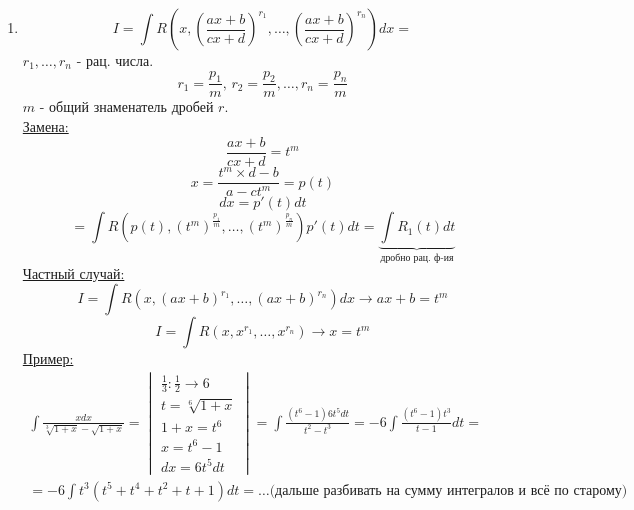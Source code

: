 \documentclass[12pt]{article}
\begin{document}
\begin{enumerate}
        \item \[ I = \int R\left( x, \left(\frac{ax+b}{cx+d}\right)^{r_1}, \dots, \left( \frac{ax+b}{cx+d} \right)^{r_n} \right)dx \boxed{=}\]
        $r_1, \dots, r_n$ - рац. числа.
        \[ r_1 = \frac{p_1}{m},\, r_2 = \frac{p_2}{m}, \dots, r_n = \frac{p_n}{m} \]
        $m$ - общий знаменатель дробей $r$.\\
        \underline{Замена:}
        \[ \boxed{\frac{ax + b}{cx + d} = t^m} \]
        \[ x = \frac{t^m \times d - b}{a - ct^m} = p(t) \]
        \[ dx = p'(t)dt \]
        \[ \boxed{=} \int R (p(t), (t^m)^{\frac{p_1}{m}}, \dots, (t^m)^{\frac{p_n}{m}})p'(t)dt = \underbrace{\int R_1(t)dt}_{\text{дробно рац. ф-ия}} \]
        \underline{Частный случай:}
        \[ I = \int R(x, (ax+b)^{r_1}, \dots, (ax+b)^{r_n})dx \to ax+b = t^m \]
        \[ I = \int R(x, x^{r_1}, \dots, x^{r_n} ) \to x = t^m \]
        \underline{Пример:}
        \begin{gather*}
            \int \frac{xdx}{\sqrt[3]{1+x} - \sqrt{1 + x}} = \begin{vmatrix}
                \frac{1}{3} : \frac{1}{2} \to 6\\
                t = \sqrt[6]{1 + x}\\
                1 + x = t^6\\
                x = t^6 - 1\\
                dx = 6t^5dt
            \end{vmatrix} = \int \frac{(t^6 - 1)6t^5dt}{t^2 - t^3} = -6 \int \frac{(t^6 - 1)t^3}{t-1}dt =\\
            = -6 \int t^3(t^5 + t^4 + t^2 + t + 1)dt = \dots \text{(дальше разбивать на сумму интегралов и всё по старому)}
        \end{gather*}


\end{enumerate}
\end{document}
